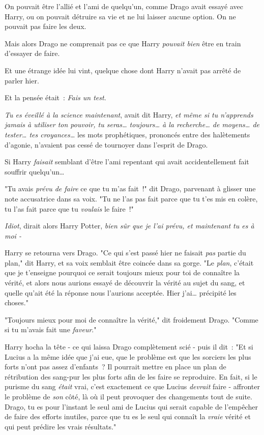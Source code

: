 On pouvait être l'allié et l'ami de quelqu'un, comme Drago avait essayé avec Harry, ou on pouvait détruire sa vie et ne lui laisser aucune option. On ne pouvait pas faire les deux.

Mais alors Drago ne comprenait pas ce que Harry \emph{pouvait bien} être en train d'essayer de faire.

Et une étrange idée lui vint, quelque chose dont Harry n'avait pas arrêté de parler hier.

Et la pensée était~: \emph{Fais un test}.

\emph{Tu es éveillé à la science maintenant}, avait dit Harry, \emph{et même si tu n'apprends jamais à utiliser ton pouvoir, tu seras… toujours… à la recherche… de moyens… de tester… tes croyances…} les mots prophétiques, prononcés entre des halètements d'agonie, n'avaient pas cessé de tournoyer dans l'esprit de Drago.

Si Harry \emph{faisait} semblant d'être l'ami repentant qui avait accidentellement fait souffrir quelqu'un…

"Tu avais \emph{prévu de faire} ce que tu m'as fait~!" dit Drago, parvenant à glisser une note accusatrice dans sa voix. "Tu ne l'as pas fait parce que tu t'es mis en colère, tu l'as fait parce que tu \emph{voulais} le faire~!"

\emph{Idiot}, dirait alors Harry Potter, \emph{bien sûr que je l'ai prévu, et maintenant tu es à moi -}

Harry se retourna vers Drago. "Ce qui s'est passé hier ne faisait \emph{pas} partie du plan," dit Harry, et sa voix semblait être coincée dans sa gorge. "Le \emph{plan}, c'était que je t'enseigne pourquoi ce serait toujours mieux pour toi de connaître la vérité, et alors nous aurions essayé de découvrir la vérité au sujet du sang, et quelle qu'ait été la réponse nous l'aurions acceptée. Hier j'ai… précipité les choses."

"Toujours mieux pour moi de connaître la vérité," dit froidement Drago. "Comme si tu m'avais fait une \emph{faveur}."

Harry hocha la tête - ce qui laissa Drago complètement scié - puis il dit~: "Et si Lucius a la même idée que j'ai eue, que le problème est que les sorciers les plus forts n'ont pas assez d'enfants~? Il pourrait mettre en place un plan de rétribution des sang-pur les plus forts afin de les faire se reproduire. En fait, si le purisme du sang \emph{était} vrai, c'est exactement ce que Lucius \emph{devrait} faire - affronter le problème de \emph{son} côté, là où il peut provoquer des changements tout de suite. Drago, tu es pour l'instant le seul ami de Lucius qui serait capable de l'empêcher de faire des efforts inutiles, parce que tu es le seul qui connaît la \emph{vraie} vérité et qui peut prédire les vrais résultats."


